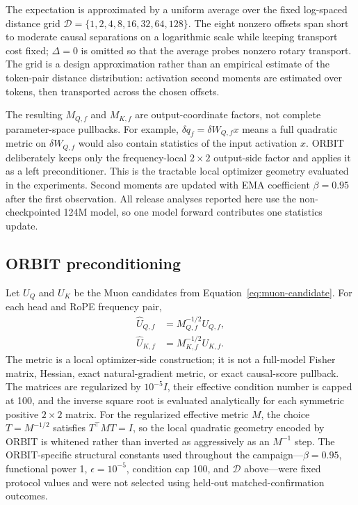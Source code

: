 The expectation is approximated by a uniform average over the fixed log-spaced distance
grid $\mathcal{D}=\{1,2,4,8,16,32,64,128\}$. The eight nonzero offsets span short to
moderate causal separations on a logarithmic scale while keeping transport cost fixed;
$\Delta=0$ is omitted so that the average probes nonzero rotary transport. The grid is a
design approximation rather than an empirical estimate of the token-pair distance
distribution: activation second moments are estimated over tokens, then transported across
the chosen offsets.

The resulting $M_{Q,f}$ and $M_{K,f}$ are output-coordinate factors, not complete
parameter-space pullbacks. For example, $\delta q_f=\delta W_{Q,f}x$ means a full
quadratic metric on $\delta W_{Q,f}$ would also contain statistics of the input activation
$x$. ORBIT deliberately keeps only the frequency-local $2\times2$ output-side factor and
applies it as a left preconditioner. This is the tractable local optimizer geometry
evaluated in the experiments. Second moments are updated with EMA coefficient $\beta=0.95$
after the first observation. All release analyses reported here use the non-checkpointed
124M model, so one model forward contributes one statistics update.

\subsection{ORBIT preconditioning}
Let $U_Q$ and $U_K$ be the Muon candidates from Equation~\ref{eq:muon-candidate}. For each
head and RoPE frequency pair,
\begin{align}
\widehat U_{Q,f} &= M_{Q,f}^{-1/2}U_{Q,f},\\
\widehat U_{K,f} &= M_{K,f}^{-1/2}U_{K,f}.
\end{align}
The metric is a local optimizer-side construction; it is not a full-model Fisher matrix,
Hessian, exact natural-gradient metric, or exact causal-score pullback. The matrices are
regularized by $10^{-5}I$, their effective condition number is capped at 100, and the
inverse square root is evaluated analytically for each symmetric positive $2\times2$
matrix. For the regularized effective metric $M$, the choice $T=M^{-1/2}$ satisfies
$T^\top M T=I$, so the local quadratic geometry encoded by ORBIT is whitened rather than
inverted as aggressively as an $M^{-1}$ step. The ORBIT-specific structural constants used
throughout the campaign---$\beta=0.95$, functional power 1, $\epsilon=10^{-5}$, condition
cap 100, and $\mathcal D$ above---were fixed protocol values and were not selected using
held-out matched-confirmation outcomes.

